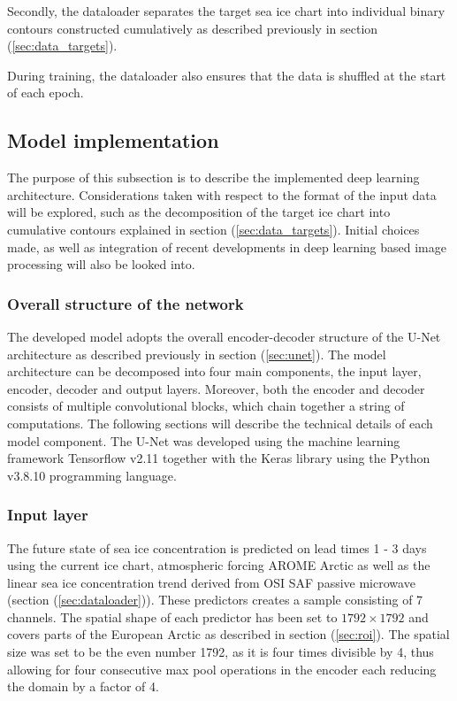 \documentclass[../main/thesis]{subfiles}
\begin{document}
Secondly, the dataloader separates the target sea ice chart into individual binary contours constructed cumulatively as described previously in section (\ref{sec:data_targets}).

During training, the dataloader also ensures that the data is shuffled at the start of each epoch. 

\subsection{Model implementation}
\label{sec:implementation}
The purpose of this subsection is to describe the implemented deep learning architecture. Considerations taken with respect to the format of the input data will be explored, such as the decomposition of the target ice chart into cumulative contours explained in section (\ref{sec:data_targets}). Initial choices made, as well as integration of recent developments in deep learning based image processing will also be looked into. 

\subsubsection{Overall structure of the network}
The developed model adopts the overall encoder-decoder structure of the U-Net architecture as described previously in section (\ref{sec:unet}). The model architecture can be decomposed into four main components, the input layer, encoder, decoder and output layers. Moreover, both the encoder and decoder consists of multiple convolutional blocks, which chain together a string of computations. The following sections will describe the technical details of each model component. The U-Net was developed using the machine learning framework Tensorflow v2.11 \citep{tensorflow2015-whitepaper} together with the Keras library \citep{chollet2015keras} using the Python v3.8.10 programming language. 

\subsubsection{Input layer}
The future state of sea ice concentration is predicted on lead times 1 - 3 days using the current ice chart, atmospheric forcing AROME Arctic as well as the linear sea ice concentration trend derived from OSI SAF passive microwave (section (\ref{sec:dataloader})). These predictors creates a sample consisting of 7 channels. The spatial shape of each predictor has been set to $1792 \times 1792$ and covers parts of the European Arctic as described in section (\ref{sec:roi}). The spatial size was set to be the even number 1792, as it is four times divisible by 4, thus allowing for four consecutive max pool operations in the encoder \citep{Ronneberger2015} each reducing the domain by a factor of 4. 
\end{document}
